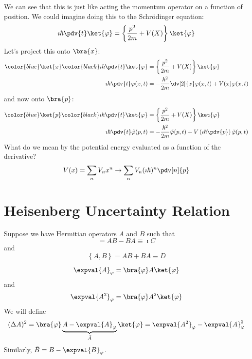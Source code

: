 \documentclass[a4paper,twoside,master.tex]{subfiles}
\begin{document}
We can see that this is just like acting the momentum operator on a function of position. We could imagine doing this to the Schr\"odinger equation:
\begin{equation}
    \imath\hbar \pdv{t} \ket{\varphi} = \left\{ \frac{p^2}{2m} + V(X) \right\} \ket{\varphi}
\end{equation}
Let's project this onto $ \bra{x} $:
\begin{align}
    \color{blue} \ket{x} \color{black} \imath\hbar \pdv{t} \ket{\varphi} &= \left\{ \frac{p^2}{2m} + V(X) \right\} \ket{\varphi}\\
    \imath\hbar \pdv{t} \varphi(x,t) &= - \frac{\hbar^2}{2m} \dv[2]{x} \varphi (x,t) + V(x) \varphi (x,t)
\end{align}
and now onto $ \bra{p} $:
\begin{align}
    \color{blue} \ket{p} \color{black} \imath\hbar \pdv{t} \ket{\varphi} &= \left\{ \frac{p^2}{2m} + V(X) \right\} \ket{\varphi}\\
    \imath\hbar \pdv{t} \tilde{\varphi}(p,t) &= - \frac{\hbar^2}{2m} \tilde{\varphi}(p,t) + V\left( \imath\hbar \pdv{p} \right) \tilde{\varphi} (p,t)
\end{align}
What do we mean by the potential energy evaluated as a function of the derivative?
\begin{equation}
    V(x) = \sum_{n} V_n x^n \to \sum_{n} V_n (\imath\hbar)^n \pdv[n]{p}
\end{equation}

\section{Heisenberg Uncertainty Relation}
\label{sec:heisenberg_uncertainty_relation}
Suppose we have Hermitian operators $ A $ and $ B $ such that
\begin{equation}
    [A,B] = AB-BA \equiv \imath C
\end{equation}
and
\begin{equation}
    \left\{ A,B \right\}= AB+BA \equiv D
\end{equation}

\begin{equation}
    \expval{A}_{\varphi} = \bra{\varphi} A \ket{\varphi}
\end{equation}
and
\begin{equation}
    \expval{A^2}_{\varphi} = \bra{\varphi} A^2 \ket{\varphi}
\end{equation}
We will define
\begin{equation}
    (\Delta A)^2 = \bra{\varphi} \underbrace{A-\expval{A}_{\varphi}}_{\tilde{A}} \ket{\varphi} = \expval{A^2}_{\varphi} - \expval{A}_{\varphi}^2
\end{equation}
Similarly, $ \tilde{B} = B - \expval{B}_{\varphi} $.
\end{document}
